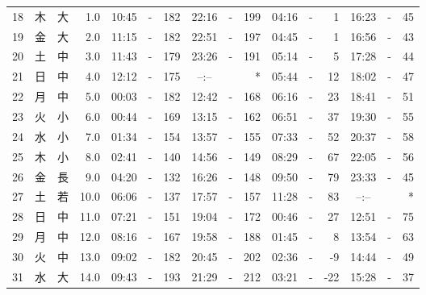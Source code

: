 \documentclass[12pt.a4j]{jsarticle}
\begin{document}
\begin{center}
\begin{table}[ht]
\begin{tabular}{|rc|cr|ccrccr|ccrccr|}
18 & 木 & 大 &  1.0 & 10:45 &-& 182 & 22:16 &-& 199 & 04:16 &-&   1 & 16:23 &-&  45 \\
19 & 金 & 大 &  2.0 & 11:15 &-& 182 & 22:51 &-& 197 & 04:45 &-&   1 & 16:56 &-&  43 \\
20 & 土 & 中 &  3.0 & 11:43 &-& 179 & 23:26 &-& 191 & 05:14 &-&   5 & 17:28 &-&  44 \\
21 & 日 & 中 &  4.0 & 12:12 &-& 175 & --:-- & &  *  & 05:44 &-&  12 & 18:02 &-&  47 \\
22 & 月 & 中 &  5.0 & 00:03 &-& 182 & 12:42 &-& 168 & 06:16 &-&  23 & 18:41 &-&  51 \\
23 & 火 & 小 &  6.0 & 00:44 &-& 169 & 13:15 &-& 162 & 06:51 &-&  37 & 19:30 &-&  55 \\
24 & 水 & 小 &  7.0 & 01:34 &-& 154 & 13:57 &-& 155 & 07:33 &-&  52 & 20:37 &-&  58 \\
25 & 木 & 小 &  8.0 & 02:41 &-& 140 & 14:56 &-& 149 & 08:29 &-&  67 & 22:05 &-&  56 \\
26 & 金 & 長 &  9.0 & 04:20 &-& 132 & 16:26 &-& 148 & 09:50 &-&  79 & 23:33 &-&  45 \\
27 & 土 & 若 & 10.0 & 06:06 &-& 137 & 17:57 &-& 157 & 11:28 &-&  83 & --:-- & &  *  \\
28 & 日 & 中 & 11.0 & 07:21 &-& 151 & 19:04 &-& 172 & 00:46 &-&  27 & 12:51 &-&  75 \\
29 & 月 & 中 & 12.0 & 08:16 &-& 167 & 19:58 &-& 188 & 01:45 &-&   8 & 13:54 &-&  63 \\
30 & 火 & 中 & 13.0 & 09:02 &-& 182 & 20:45 &-& 202 & 02:36 &-&  -9 & 14:44 &-&  49 \\
31 & 水 & 大 & 14.0 & 09:43 &-& 193 & 21:29 &-& 212 & 03:21 &-& -22 & 15:28 &-&  37 \\
\hline
\end{tabular}
\end{table}
\newpage
\end{center}
\end{document}
